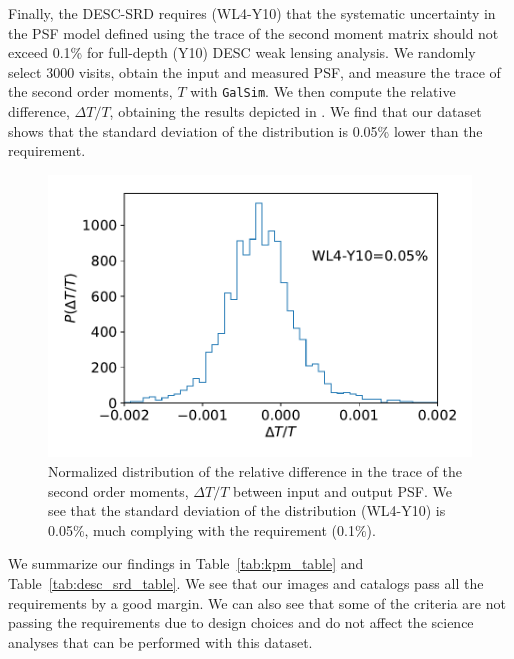 \documentclass[twocolumn]{aastex62}
\begin{document}
Finally, the DESC-SRD requires (WL4-Y10) that the systematic uncertainty in the PSF model defined using the trace of the second moment matrix should not exceed 0.1\% for full-depth (Y10) DESC weak lensing analysis. We randomly select 3000 visits, obtain the input and measured PSF, and measure the trace of the second order moments, $T$ with \texttt{GalSim}. We then compute the relative difference, $\Delta T/T$, obtaining the results depicted in . We find that our dataset shows that the standard deviation of the distribution is 0.05\% lower than the requirement.
\begin{figure}
\centering
\includegraphics[width=0.9\columnwidth]{WL4-Y10}
\caption{Normalized distribution of the relative difference in the trace of the second order moments, $\Delta T/T$ between input and output PSF. We see that the standard deviation of the distribution (WL4-Y10) is 0.05\%, much complying with the requirement (0.1\%).}
\label{fig:WL4-Y10}
\end{figure}

We summarize our findings in Table~\ref{tab:kpm_table} and Table~\ref{tab:desc_srd_table}. We see that our images and catalogs pass all the requirements by a good margin. We can also see that some of the criteria are not passing the requirements due to design choices and do not affect the science analyses that can be performed with this dataset.
\end{document}
